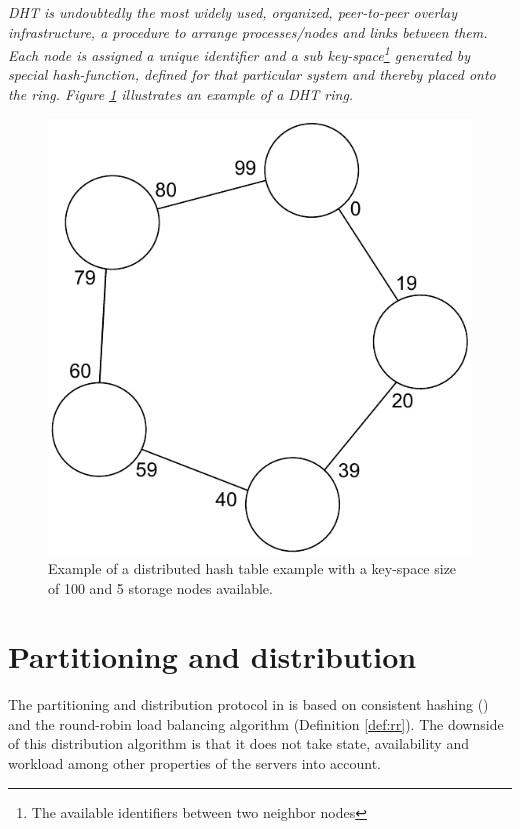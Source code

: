 \begin{definition} \label{def:dht}
\textit{DHT is undoubtedly the most widely used, organized, peer-to-peer overlay infrastructure, a procedure to arrange processes/nodes and links between them. Each node is assigned a unique identifier and a sub key-space\footnote{The available identifiers between two neighbor nodes}  generated by special hash-function, defined for that particular system and thereby placed onto the ring. Figure \ref{fig:dht} illustrates an example of a DHT ring.}

\begin{figure}[h!]
	\centering
	\includegraphics[scale=0.6]{pdf/dht.pdf}
	\vspace*{3mm}
	\caption[]{Example of a distributed hash table example with a key-space size of 100 and 5 storage nodes available. \label{fig:dht}}
\end{figure}
\end{definition}

\section{Partitioning and distribution} \label{sec:pandd}
The partitioning and distribution protocol in \CodeName is based on consistent hashing () and the round-robin load balancing algorithm (Definition \ref{def:rr}). The downside of this distribution algorithm is that it does not take state, availability and workload among other properties of the servers into account. 
\newline

